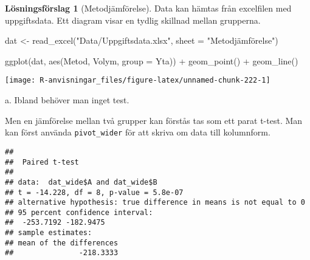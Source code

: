 \documentclass[
]{book}
\newenvironment{Shaded}{\begin{snugshade}}{\end{snugshade}}
\newcommand{\AttributeTok}[1]{\textcolor[rgb]{0.77,0.63,0.00}{#1}}
\newcommand{\FunctionTok}[1]{\textcolor[rgb]{0.00,0.00,0.00}{#1}}
\newcommand{\NormalTok}[1]{#1}
\newcommand{\OtherTok}[1]{\textcolor[rgb]{0.56,0.35,0.01}{#1}}
\newcommand{\SpecialCharTok}[1]{\textcolor[rgb]{0.00,0.00,0.00}{#1}}
\newcommand{\StringTok}[1]{\textcolor[rgb]{0.31,0.60,0.02}{#1}}
\theoremstyle{definition}
\theoremstyle{definition}
\theoremstyle{definition}
\theoremstyle{definition}
\newtheorem{hypothesis}{Lösningsförslag}[chapter]
\theoremstyle{remark}
\begin{document}
\begin{hypothesis}[Metodjämförelse]
Data kan hämtas från excelfilen med uppgiftsdata. Ett diagram visar en tydlig skillnad mellan grupperna.

\begin{Shaded}
\begin{Highlighting}[]
\NormalTok{dat }\OtherTok{\textless{}{-}} \FunctionTok{read\_excel}\NormalTok{(}\StringTok{"Data/Uppgiftsdata.xlsx"}\NormalTok{, }\AttributeTok{sheet =} \StringTok{"Metodjämförelse"}\NormalTok{)}

\FunctionTok{ggplot}\NormalTok{(dat, }\FunctionTok{aes}\NormalTok{(Metod, Volym, }\AttributeTok{group =}\NormalTok{ Yta)) }\SpecialCharTok{+}
  \FunctionTok{geom\_point}\NormalTok{() }\SpecialCharTok{+}
  \FunctionTok{geom\_line}\NormalTok{()}
\end{Highlighting}
\end{Shaded}

\begin{center}\texttt{[image: R-anvisningar\_files/figure-latex/unnamed-chunk-222-1]} \end{center}

a. Ibland behöver man inget test.

Men en jämförelse mellan två grupper kan förstås tas som ett parat t-test. Man kan först använda \texttt{pivot\_wider} för att skriva om data till kolumnform.

\begin{Shaded}
\end{Shaded}

\begin{verbatim}
## 
##  Paired t-test
## 
## data:  dat_wide$A and dat_wide$B
## t = -14.228, df = 8, p-value = 5.8e-07
## alternative hypothesis: true difference in means is not equal to 0
## 95 percent confidence interval:
##  -253.7192 -182.9475
## sample estimates:
## mean of the differences 
##               -218.3333
\end{verbatim}


\end{hypothesis}
\end{document}
